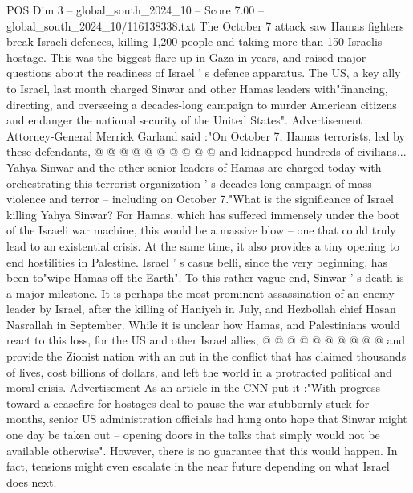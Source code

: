 \begin{textsample}{POS Dim 3 – global\_south\_2024\_10 – Score 7.00 – global\_south\_2024\_10/116138338.txt}
The October 7 attack saw Hamas fighters break Israeli defences, killing 1,200 people and taking more than 150 Israelis hostage.
This was the biggest flare-up in Gaza in years, and raised major questions about the readiness of Israel ' s defence apparatus.
The US, a key ally to Israel, last month charged Sinwar and other Hamas leaders with"financing, directing, and overseeing a decades-long campaign to murder American citizens and endanger the national security of the United States".
Advertisement Attorney-General Merrick Garland said :"On October 7, Hamas terrorists, led by these defendants, @ @ @ @ @ @ @ @ @ @ and kidnapped hundreds of civilians...
Yahya Sinwar and the other senior leaders of Hamas are charged today with orchestrating this terrorist organization ' s decades-long campaign of mass violence and terror -- including on October 7."What is the significance of Israel killing Yahya Sinwar?
For Hamas, which has suffered immensely under the boot of the Israeli war machine, this would be a massive blow -- one that could truly lead to an existential crisis.
At the same time, it also provides a tiny opening to end hostilities in Palestine.
Israel ' s casus belli, since the very beginning, has been to"wipe Hamas off the Earth".
To this rather vague end, Sinwar ' s death is a major milestone.
It is perhaps the most prominent assassination of an enemy leader by Israel, after the killing of Haniyeh in July, and Hezbollah chief Hasan Nasrallah in September.
While it is unclear how Hamas, and Palestinians would react to this loss, for the US and other Israel allies, @ @ @ @ @ @ @ @ @ @ and provide the Zionist nation with an out in the conflict that has claimed thousands of lives, cost billions of dollars, and left the world in a protracted political and moral crisis.
Advertisement As an article in the CNN put it :"With progress toward a ceasefire-for-hostages deal to pause the war stubbornly stuck for months, senior US administration officials had hung onto hope that Sinwar might one day be taken out -- opening doors in the talks that simply would not be available otherwise".
However, there is no guarantee that this would happen.
In fact, tensions might even escalate in the near future depending on what Israel does next.

\end{textsample}
